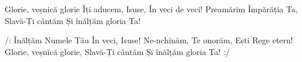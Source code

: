 \beginverse
Glorie, veșnică glorie
Îți aducem, Isuse,
În veci de veci!
Preamărim Împărăția Ta,
Slavă-Ți cântăm
Și înălțăm gloria Ta!
\endverse

\beginchorus
/: Înălțăm Numele Tău
În veci, Isuse!
Ne-nchinăm, Te onorăm,
Ești Rege etern!
Glorie, veșnică glorie,
Slavă-Ți cântăm
Și înălțăm gloria Ta! :/
\endchorus
\endsong